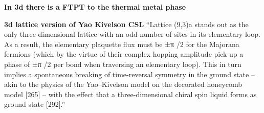 \textbf{In 3d there is a FTPT to the thermal metal phase}

\textbf{3d lattice version of Yao Kivelson CSL} ``Lattice (9,3)a stands out as the only three-dimensional lattice with an odd number of sites in its elementary loop. As a result, the elementary plaquette flux must be ±π /2 for the Majorana fermions (which by the virtue of their complex hopping amplitude pick up a phase of ±π /2 per bond when traversing an elementary loop). This in turn implies a spontaneous breaking of time-reversal symmetry in the ground state -- akin to the physics of the Yao--Kivelson model on the decorated honeycomb model {[}265{]} -- with the effect that a three-dimensional chiral spin liquid forms as ground state {[}292{]}.''

\begin{lstlisting}[language=Python]
\end{lstlisting}
